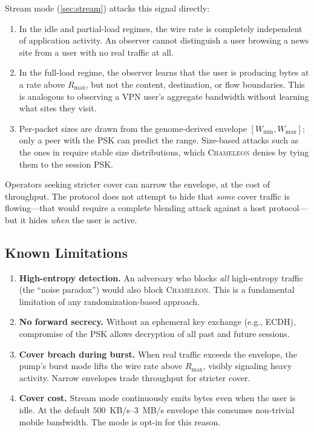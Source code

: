 \documentclass[11pt,a4paper]{article}
\newcommand{\chameleon}{\textsc{Chameleon}}
\begin{document}
Stream mode (\cref{sec:stream}) attacks this signal directly:
\begin{enumerate}[nosep]
  \item In the idle and partial-load regimes, the wire rate is completely independent of application activity. An observer cannot distinguish a user browsing a news site from a user with no real traffic at all.
  \item In the full-load regime, the observer learns that the user is producing bytes at a rate above $R_{\max}$, but not the content, destination, or flow boundaries. This is analogous to observing a VPN user's aggregate bandwidth without learning what sites they visit.
  \item Per-packet sizes are drawn from the genome-derived envelope $[W_{\min}, W_{\max}]$; only a peer with the PSK can predict the range. Size-based attacks such as the ones in \cite{dyer2012peekaboo} require stable size distributions, which \chameleon{} denies by tying them to the session PSK.
\end{enumerate}

Operators seeking stricter cover can narrow the envelope, at the cost of throughput. The protocol does not attempt to hide that \emph{some} cover traffic is flowing---that would require a complete blending attack against a host protocol---but it hides \emph{when} the user is active.

\subsection{Known Limitations}\label{sec:limitations}

\begin{enumerate}[nosep]
  \item \textbf{High-entropy detection.} An adversary who blocks \emph{all} high-entropy traffic (the ``noise paradox'') would also block \chameleon{}. This is a fundamental limitation of any randomization-based approach.
  \item \textbf{No forward secrecy.} Without an ephemeral key exchange (e.g., ECDH), compromise of the PSK allows decryption of all past and future sessions.
  \item \textbf{Cover breach during burst.} When real traffic exceeds the envelope, the pump's burst mode lifts the wire rate above $R_{\max}$, visibly signaling heavy activity. Narrow envelopes trade throughput for stricter cover.
  \item \textbf{Cover cost.} Stream mode continuously emits bytes even when the user is idle. At the default $500$~KB/s--$3$~MB/s envelope this consumes non-trivial mobile bandwidth. The mode is opt-in for this reason.
\end{enumerate}
\end{document}
